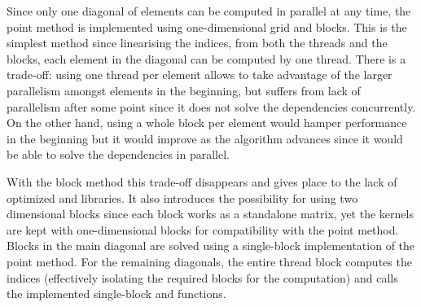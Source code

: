\documentclass[../thesis]{subfiles}
\begin{document}
	Since only one diagonal of elements can be computed in parallel at any time, the point method is implemented using one-dimensional grid and blocks. This is the simplest method since linearising the indices, from both the threads and the blocks, each element in the diagonal can be computed by one thread. There is a trade-off: using one thread per element allows to take advantage of the larger parallelism amongst elements in the beginning, but suffers from lack of parallelism after some point since it does not solve the dependencies concurrently. On the other hand, using a whole block per element would hamper performance in the beginning but it would improve as the algorithm advances since it would be able to solve the dependencies in parallel.

	With the block method this trade-off disappears and gives place to the lack of optimized \blas and \lapack libraries. It also introduces the possibility for using two dimensional blocks since each block works as a standalone matrix, yet the kernels are kept with one-dimensional blocks for compatibility with the point method. Blocks in the main diagonal are solved using a single-block implementation of the point method. For the remaining diagonals, the entire thread block computes the indices (effectively isolating the required blocks for the computation) and calls the implemented single-block \blas and \lapack functions.
\end{document}
